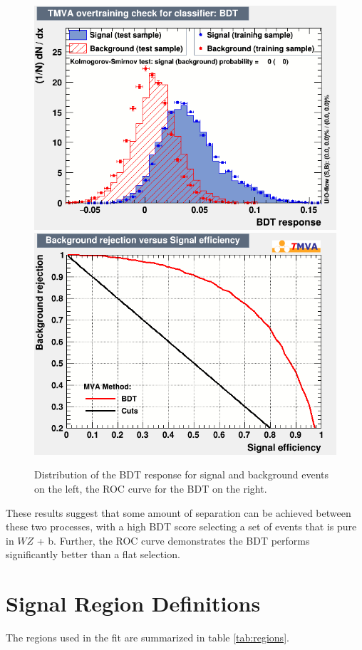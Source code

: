 \documentclass[NOTE, atlasdraft=true, texlive=2016, UKenglish]{\ATLASLATEXPATH atlasdoc}
\begin{document}
\begin{figure}[H]
\center
    \includegraphics[width=.45\linewidth]{tZ_bdt/overtrain_BDT.png}%
    \includegraphics[width=.45\linewidth]{tZ_bdt/rejBvsS.png}\\
    \caption{Distribution of the BDT response for signal and background events on the left, the ROC curve for the BDT on the right.}
    \label{fig:tZ_bdt}
\end{figure}

These results suggest that some amount of separation can be achieved between these two processes, with a high BDT score selecting a set of events that is pure in $WZ$ + b. Further, the ROC curve demonstrates the BDT performs significantly better than a flat selection.


\section{Signal Region Definitions}
\label{sec:signal_region}

The regions used in the fit are summarized in table \ref{tab:regions}.
\end{document}
